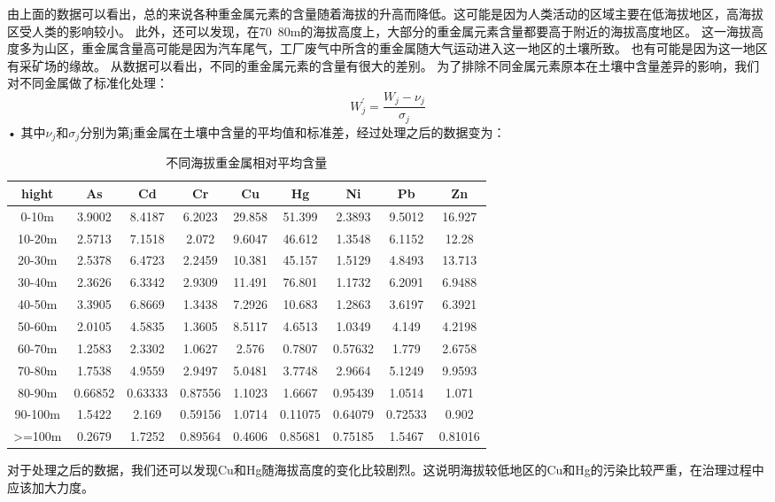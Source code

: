\documentclass[a4paper]{article}
\begin{document}
由上面的数据可以看出，总的来说各种重金属元素的含量随着海拔的升高而降低。这可能是因为人类活动的区域主要在低海拔地区，高海拔区受人类的影响较小。
此外，还可以发现，在70~80m的海拔高度上，大部分的重金属元素含量都要高于附近的海拔高度地区。
这一海拔高度多为山区，重金属含量高可能是因为汽车尾气，工厂废气中所含的重金属随大气运动进入这一地区的土壤所致。
也有可能是因为这一地区有采矿场的缘故。
从数据可以看出，不同的重金属元素的含量有很大的差别。
为了排除不同金属元素原本在土壤中含量差异的影响，我们对不同金属做了标准化处理：
\begin{equation}
W_j^{\prime} = \frac{W_j - \nu_j}{\sigma_j}
\end{equation}•
其中$\nu_j$和$\sigma_j$分别为第j重金属在土壤中含量的平均值和标准差，经过处理之后的数据变为：
\begin{table}[H]
		\centering
		\caption{不同海拔重金属相对平均含量}
		\label{average-contend}
		\begin{tabular}{c|cccccccc}
			hight	  &          	As	&   Cd   &     Cr     &   Cu   &     Hg  &    Ni   &     Pb    &   Zn  \\
			\hline
			 0-10m     	&	 3.9002  &   8.4187   &  6.2023  &  29.858  &   51.399  &   2.3893  &   9.5012  &   16.927    \\
    			10-20m     	&	 2.5713  &   7.1518   &   2.072  &  9.6047  &   46.612  &   1.3548  &   6.1152  &    12.28    \\
   			20-30m    	&	 2.5378  &   6.4723   &  2.2459  &  10.381  &   45.157  &   1.5129  &   4.8493  &   13.713    \\
    			30-40m     	&	 2.3626  &   6.3342   &  2.9309  &  11.491  &   76.801  &   1.1732  &   6.2091  &   6.9488    \\
    			40-50m     	&	 3.3905  &   6.8669   &  1.3438  &  7.2926  &   10.683  &   1.2863  &   3.6197  &   6.3921    \\
    			50-60m      	&	 2.0105  &   4.5835   &  1.3605  &  8.5117  &   4.6513  &   1.0349  &    4.149  &   4.2198    \\
    			60-70m     	&	 1.2583  &   2.3302   &  1.0627  &   2.576  &   0.7807  &  0.57632  &    1.779  &   2.6758    \\
    			70-80m     	&	 1.7538  &   4.9559   &  2.9497  &  5.0481  &   3.7748  &   2.9664  &   5.1249  &   9.9593    \\
    			80-90m     	&	 0.66852 &   0.63333  &  0.87556 &   1.1023 &    1.6667 &   0.95439 &    1.0514 &     1.071   \\
    			90-100m    	&	 1.5422  &    2.169   & 0.59156  &  1.0714  &  0.11075  &  0.64079  &  0.72533  &    0.902    \\
    			>=100m    	&	 0.2679  &   1.7252   & 0.89564  &  0.4606  &  0.85681  &  0.75185  &   1.5467  &  0.81016    \\
		\end{tabular}
	\end{table}
对于处理之后的数据，我们还可以发现Cu和Hg随海拔高度的变化比较剧烈。这说明海拔较低地区的Cu和Hg的污染比较严重，在治理过程中应该加大力度。
\end{document}
